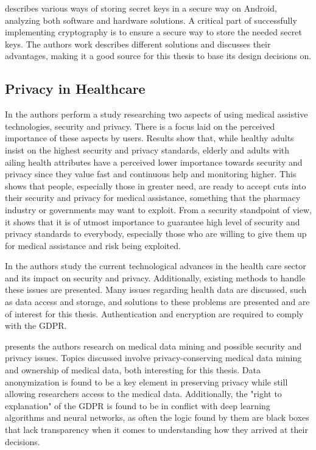 \cite{cooijmans2014analysis} describes various ways of storing secret keys in a secure way on Android, analyzing both software and hardware solutions. A critical part of successfully implementing cryptography is to ensure a secure way to store the needed secret keys. The authors work describes different solutions and discusses their advantages, making it a good source for this thesis to base its design decisions on. 


\subsection{Privacy in Healthcare}
\label{subsection:privacyconcerns}

In \cite{wilkowska2012privacy} the authors perform a study researching two aspects of using medical assistive technologies, security and privacy. There is a focus laid on the perceived importance of these aspects by users. Results show that, while healthy adults insist on the highest security and privacy standards, elderly and adults with ailing health attributes have a perceived lower importance towards security and privacy since they value fast and continuous help and monitoring higher. This shows that people, especially those in greater need, are ready to accept cuts into their security and privacy for medical assistance, something that the pharmacy industry or governments may want to exploit. From a security standpoint of view, it shows that it is of utmost importance to guarantee high level of security and privacy standards to everybody, especially those who are willing to give them up for medical assistance and risk being exploited.

In \cite{meingast2006security} the authors study the current technological advances in the health care sector and its impact on security and privacy. Additionally, existing methods to handle these issues are presented. Many issues regarding health data are discussed, such as data access and storage, and solutions to these problems are presented and are of interest for this thesis. Authentication and encryption are required to comply with the GDPR.

\cite{cios2019uniqueness} presents the authors research on medical data mining and possible security and privacy issues. Topics discussed involve privacy-conserving medical data mining and ownership of medical data, both interesting for this thesis. Data anonymization is found to be a key element in preserving privacy while still allowing researchers access to the medical data. Additionally, the "right to explanation" of the GDPR is found to be in conflict with deep learning algorithms and neural networks, as often the logic found by them are black boxes that lack transparency when it comes to understanding how they arrived at their decisions.


